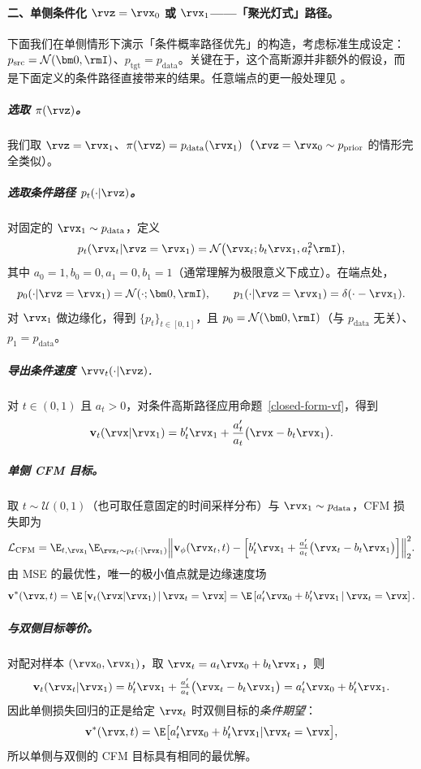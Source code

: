 \paragraph{二、单侧条件化 $\rvz = \rvx_0$ 或 $\rvx_1$——「聚光灯式」路径。}
下面我们在单侧情形下演示「条件概率路径优先」的构造，考虑标准生成设定：$p_{\mathrm{src}}=\mathcal N(\bm 0,\rmI)$、$p_{\mathrm{tgt}}=p_{\mathrm{data}}$。关键在于，这个高斯源并非额外的假设，而是下面定义的条件路径直接带来的结果。任意端点的更一般处理见 。

\subparagraph{选取 $\pi(\rvz)$。}
我们取 $\rvz=\rvx_1$、$\pi(\rvz)=p_{\mathrm{data}}(\rvx_1)$（$\rvz=\rvx_0\sim p_{\mathrm{prior}}$ 的情形完全类似）。

\subparagraph{选取条件路径 $p_t(\cdot|\rvz)$。}
对固定的 $\rvx_1\sim p_{\mathrm{data}}$，定义
\[
p_t(\rvx_t|\rvz=\rvx_1)=\mathcal N \big(\rvx_t; b_t \rvx_1, a_t^2 \rmI\big),
\]
其中 $ a_0=1, b_0=0, a_1=0, b_1=1$（通常理解为极限意义下成立）。在端点处，
\[
p_0(\cdot|\rvz=\rvx_1)=\mathcal N(\cdot; \bm 0,\rmI),\qquad
p_1(\cdot|\rvz=\rvx_1)=\delta(\cdot - \rvx_1).
\]
对 $\rvx_1$ 做边缘化，得到 $\{p_t\}_{t\in[0,1]}$，且
$p_0=\mathcal N(\bm 0,\rmI)$（与 $p_{\mathrm{data}}$ 无关）、$p_1=p_{\mathrm{data}}$。

\subparagraph{导出条件速度  $\rvv_t(\cdot|\rvz)$.}
对 $t\in(0,1)$ 且 $a_t>0$，对条件高斯路径应用命题~\ref{closed-form-vf}，得到
\[
\mathbf v_t(\rvx|\rvx_1)
= b_t' \rvx_1 + \frac{a_t'}{a_t} \big(\rvx - b_t \rvx_1\big).
\]

\subparagraph{单侧 CFM 目标。}
取 $t\sim\mathcal U(0,1)$（也可取任意固定的时间采样分布）与 $\rvx_1\sim p_{\mathrm{data}}$，CFM 损失即为
\begin{align}\label{eq:one-sided-cfm}
    \mathcal L_{\mathrm{CFM}}
=\E_{t,\rvx_1} \E_{\rvx_t\sim p_t(\cdot|\rvx_1)}
\Big\|\mathbf v_\phi(\rvx_t,t)-
\Big[b_t'\rvx_1+\tfrac{a_t'}{a_t}\big(\rvx_t-b_t\rvx_1\big)\Big]\Big\|_2^2.
\end{align}
由 MSE 的最优性，唯一的极小值点就是边缘速度场
\[
\mathbf v^*(\rvx,t)
= \E \left[\mathbf v_t(\rvx|\rvx_1) \,\middle|\, \rvx_t=\rvx\right]
= \E \left[a_t'\rvx_0+b_t'\rvx_1 \,\middle|\, \rvx_t=\rvx\right].
\]

\subparagraph{与双侧目标等价。}
对配对样本 $(\rvx_0,\rvx_1)$，取 $\rvx_t=a_t\rvx_0+b_t\rvx_1$，则
\[
\mathbf v_t(\rvx_t|\rvx_1)
= b_t'\rvx_1 + \tfrac{a_t'}{a_t}\big(\rvx_t-b_t\rvx_1\big)
= a_t'\rvx_0 + b_t'\rvx_1.
\]
因此单侧损失回归的正是给定 $\rvx_t$ 时双侧目标的\emph{条件期望}：
\[
\mathbf v^*(\rvx,t)=\E \big[a_t'\rvx_0 + b_t'\rvx_1 | \rvx_t=\rvx\big],
\]
所以单侧与双侧的 CFM 目标具有相同的最优解。


